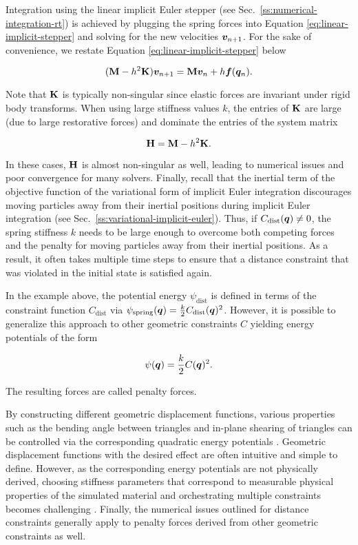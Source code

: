 Integration using the linear implicit Euler stepper (see Sec.\ \ref{ss:numerical-integration-rt}) is achieved by plugging the spring 
forces into Equation \ref{eq:linear-implicit-stepper} and solving for the new velocities $\bm{v}_{n+1}$. For the sake of convenience, 
we restate Equation \ref{eq:linear-implicit-stepper} below

\[
    (\mathbf{M} - h^2\mathbf{K})\bm{v}_{n+1} = \mathbf{M}\bm{v}_n + h\bm{f}(\bm{q}_n).
\]

\noindent Note that $\mathbf{K}$ is typically non-singular since elastic forces are invariant under rigid body transforms. When using 
large stiffness values $k$, the entries of $\mathbf{K}$ are large (due to large restorative forces) and dominate the entries of the 
system matrix 

\begin{equation}\label{eq:system-H}
    \mathbf{H} = \mathbf{M} - h^2\mathbf{K}.
\end{equation}

\noindent In these cases, $\mathbf{H}$ is almost non-singular as well, leading to numerical issues and poor convergence for many solvers. 
Finally, recall that the inertial term of the objective function of the variational form of implicit Euler integration discourages moving 
particles away from their inertial positions during implicit Euler integration (see Sec.\ \ref{ss:variational-implicit-euler}). 
Thus, if $C_\text{dist}(\bm{q}) \neq 0$, the spring stiffness $k$ needs to be large enough to overcome both competing forces and the 
penalty for moving particles away from their inertial positions. As a result, it often takes multiple time steps to ensure that a distance 
constraint that was violated in the initial state is satisfied again.

In the example above, the potential energy $\psi_\text{dist}$ is defined in terms of the constraint function $C_\text{dist}$ via 
$\psi_\text{spring}(\bm{q}) = \frac{k}{2} C_\text{dist}(\bm{q})^2$. However, it is possible to generalize this approach to other 
geometric constraints $C$ yielding energy potentials of the form

\begin{equation}\label{eq:penalty-forces}
    \psi(\bm{q}) = \frac{k}{2} C(\bm{q})^2.
\end{equation}

\noindent The resulting forces are called penalty forces.

By constructing different geometric displacement functions, various properties such as the bending angle between triangles and in-plane 
shearing of triangles can be controlled via the corresponding quadratic energy potentials \cite{baraff1998}. Geometric displacement 
functions with the desired effect are often intuitive and simple to define. However, as the corresponding energy potentials are not physically 
derived, choosing stiffness parameters that correspond to measurable physical properties of the simulated material and orchestrating 
multiple constraints becomes challenging \cite{servin2006, nealen2006}. Finally, the numerical issues outlined for distance constraints 
generally apply to penalty forces derived from other geometric constraints as well.

